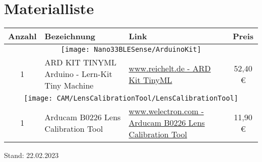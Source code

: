 %
%


\chapter{Materialliste}



	\begin{longtable}{cp{6.1cm}p{2.5cm}c}
      \textbf{Anzahl} & \textbf{Bezeichnung} & \textbf{Link} & \textbf{Preis} \\ \hline      
      \multicolumn{4}{c}{\texttt{[image: Nano33BLESense/ArduinoKit]}} \\
      1      & ARD KIT TINYML Arduino - Lern-Kit Tiny Machine
             & \href{https://www.reichelt.de/arduino-lern-kit-tiny-machine-ard-kit-tinyml-p304338.html}{www.reichelt.de -  ARD Kit TinyML } 
             &  52{,}40 \euro{} \\ \hline 
      \multicolumn{4}{c}{\texttt{[image: CAM/LensCalibrationTool/LensCalibrationTool]}} \\
      1      & Arducam B0226 Lens Calibration Tool
& \href{https://www.welectron.com/Arducam-B0226-Lens-Calibration-Tool}{www.welectron.com -  Arducam B0226 Lens Calibration Tool } 
&  11{,}90 \euro{} \\ \hline
    \end{longtable}

Stand: 22.02.2023



